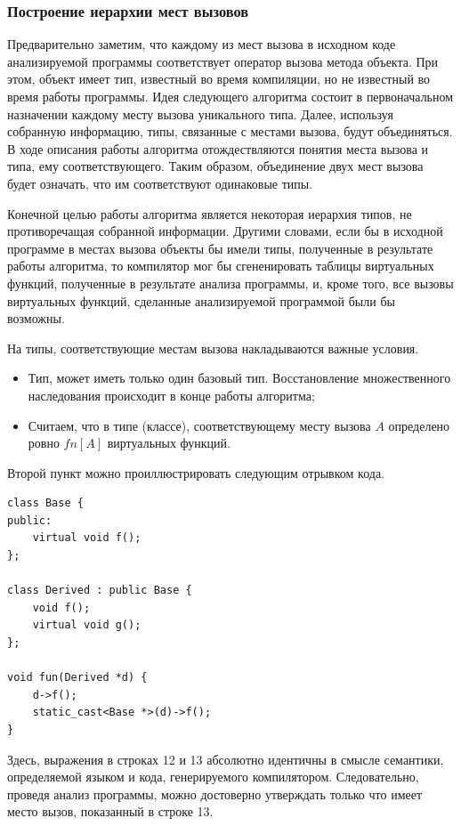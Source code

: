 \documentclass[a4paper,12pt,russian]{article}
\newcommand{\code}[1]{\textsf{#1}}
\begin{document}
\subsubsection{Построение иерархии мест вызовов}
Предварительно заметим, что каждому из мест вызова в исходном коде анализируемой программы соответствует оператор вызова метода объекта.
При этом, объект имеет тип, известный во время компиляции, но не известный во время работы программы.
Идея следующего алгоритма состоит в первоначальном назначении каждому месту вызова уникального типа.
Далее, используя собранную информацию, типы, связанные с местами вызова, будут объединяться.
В ходе описания работы алгоритма отождествляются понятия места вызова и типа, ему соответствующего.
Таким образом, объединение двух мест вызова будет означать, что им соответствуют одинаковые типы.

Конечной целью работы алгоритма является некоторая иерархия типов, не противоречащая собранной информации.
Другими словами, если бы в исходной программе в местах вызова объекты бы имели типы, полученные в результате работы алгоритма,
то компилятор мог бы сгененировать таблицы виртуальных функций, полученные в результате анализа программы, и, кроме того, все вызовы виртуальных функций,
сделанные анализируемой программой были бы возможны.

На типы, соответствующие местам вызова накладываются важные условия.
\begin{itemize}
\item Тип, может иметь только один базовый тип. Восстановление множественного наследования происходит в конце работы алгоритма;
\item Считаем, что в типе (классе), соответствующему месту вызова $A$ определено ровно $fn[A]$ виртуальных функций.
\end{itemize}
Второй пункт можно проиллюстрировать следующим отрывком кода.
\begin{lstlisting}
class Base {
public:
    virtual void f();
};

class Derived : public Base {
    void f();
    virtual void g();
};

void fun(Derived *d) {
    d->f();
    static_cast<Base *>(d)->f();
}
\end{lstlisting}

Здесь, выражения в строках \code{12} и \code{13} абсолютно идентичны в смысле семантики, определяемой языком и кода, генерируемого компилятором.
Следовательно, проведя анализ программы, можно достоверно утверждать только что имеет место вызов, показанный в строке \code{13}.
\end{document}
